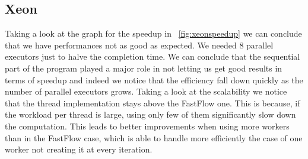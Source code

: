 \documentclass[10pt]{article}
\numberwithin{equation}{section}
\begin{document}
\subsection{Xeon}
Taking a look at the graph for the speedup in \figurename~\ref{fig:xeonspeedup} we can conclude that we have performances not as good as expected. We needed $8$ parallel executors just to halve the completion time. We can conclude that the sequential part of the program played a major role in not letting us get good results in terms of speedup and indeed we notice that the efficiency fall down quickly as the number of parallel executors grows. Taking a look at the scalability we notice that the thread implementation stays above the FastFlow one. This is because, if the workload per thread is large, using only few of them significantly slow down the computation. This leads to better improvements when using more workers than in the FastFlow case, which is able to handle more efficiently the case of one worker not creating it at every iteration.
\end{document}
